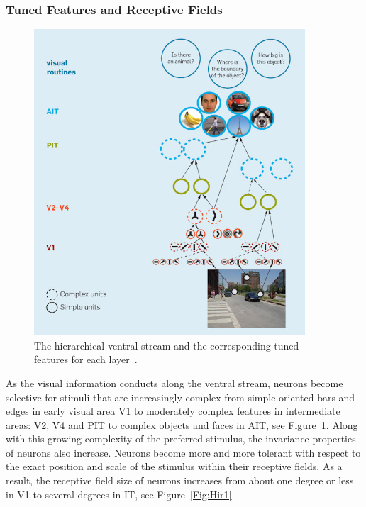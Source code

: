 \subsubsection{Tuned Features and Receptive Fields }
\begin{figure}[h!]
	\centering
	\includegraphics[width=0.9\textwidth]{pics/serre.jpg}
	\caption{The hierarchical ventral stream and the corresponding tuned features for each layer~\cite{serre2010neuromorphic}.}
	\label{Fig:serre}
\end{figure}
As the visual information conducts along the ventral stream, neurons become selective for stimuli that are increasingly complex from simple oriented bars and edges in early visual area V1 to moderately complex features in intermediate areas: V2, V4 and PIT to complex objects and faces in AIT, see Figure~\ref{Fig:serre}.
Along with this growing complexity of the preferred stimulus, the invariance properties of neurons also increase.
Neurons become more and more tolerant with respect to the exact position and scale of the stimulus within their receptive fields.
As a result, the receptive field size of neurons increases from
about one degree or less in V1 to several degrees in IT, see Figure~\ref{Fig:Hir1}.


